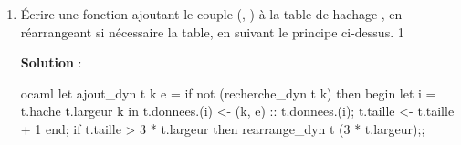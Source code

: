 \documentclass[10pt,a4paper, varwidth]{article}
\def\cor{1}
\begin{document}
	\begin{enumerate}[resume]
		\item Écrire une fonction  ajoutant le couple (, ) à la table de hachage , en réarrangeant si nécessaire la table, en suivant le principe ci-dessus.
		\if\cor1
        \begin{emphase}
            \textbf{Solution} : 
            \begin{center}
\begin{code}{ocaml}
let ajout_dyn t k e =
    if not (recherche_dyn t k) then begin
        let i = t.hache t.largeur k in
        t.donnees.(i) <- (k, e) :: t.donnees.(i);
        t.taille <- t.taille + 1
        end;
    if t.taille > 3 * t.largeur then
        rearrange_dyn t (3 * t.largeur);;    
\end{code}
            \end{center}
        \end{emphase}
        \fi
	\end{enumerate}
\end{document}
